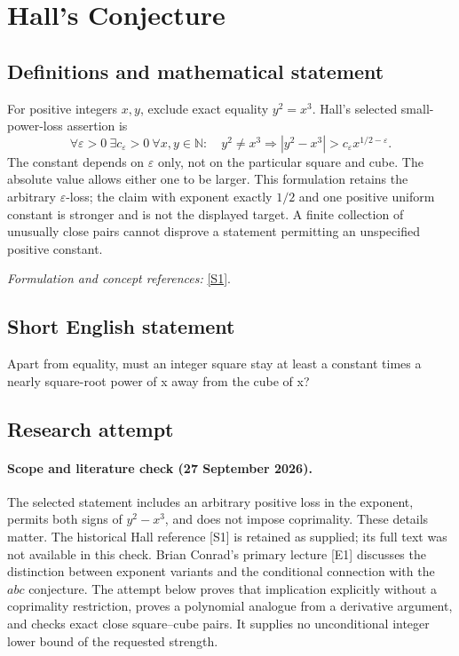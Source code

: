 \documentclass[11pt]{article}
\begin{document}
\section*{\texorpdfstring{Hall's Conjecture}{Hall's Conjecture}}\label{1241}
\subsection{Definitions and mathematical statement}
For positive integers $x,y$, exclude exact equality $y^2=x^3$. Hall's selected small-power-loss assertion is
\[
 \forall{\varepsilon}>0\ \exists c_{\varepsilon}>0\ \forall x,y\in{\mathbb{N}}:\quad
 y^2\ne x^3\Longrightarrow
 |y^2-x^3|>c_{\varepsilon} x^{1/2-{\varepsilon}}.
\]
The constant depends on ${\varepsilon}$ only, not on the particular square and cube. The absolute value allows either one to be larger. This formulation retains the arbitrary ${\varepsilon}$-loss; the claim with exponent exactly $1/2$ and one positive uniform constant is stronger and is not the displayed target. A finite collection of unusually close pairs cannot disprove a statement permitting an unspecified positive constant.
\par\smallskip\textit{Formulation and concept references:} \href{https://doi.org/10.1007/BF01140190}{[S1]}.

\subsection{Short English statement}
Apart from equality, must an integer square stay at least a constant times a nearly square-root power of x away from the cube of x?
\subsection{Research attempt}
\paragraph{Scope and literature check (27 September 2026).}
The selected statement includes an arbitrary positive loss in the exponent, permits both signs of $y^2-x^3$, and does not impose coprimality. These details matter. The historical Hall reference [S1] is retained as supplied; its full text was not available in this check. Brian Conrad's primary lecture [E1] discusses the distinction between exponent variants and the conditional connection with the $abc$ conjecture. The attempt below proves that implication explicitly without a coprimality restriction, proves a polynomial analogue from a derivative argument, and checks exact close square--cube pairs. It supplies no unconditional integer lower bound of the requested strength.
\end{document}
